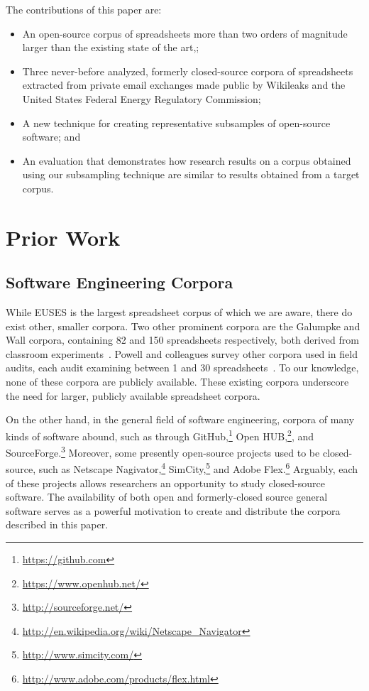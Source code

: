 \documentclass[conference]{IEEEtran}
\begin{document}
The contributions of this paper are:

\begin{itemize}
  \item An open-source corpus of spreadsheets more than two orders of magnitude larger
 		than the existing state of the art,;
  \item Three never-before analyzed, formerly closed-source corpora of spreadsheets extracted
  		from private email exchanges made public by Wikileaks and the United States Federal 
  		Energy Regulatory Commission;
  \item A new technique for creating representative subsamples of open-source
  		software; and
  \item An evaluation that demonstrates 
		how research results on a corpus obtained using our subsampling technique
		are similar to results obtained from a target corpus.
\end{itemize}

\section{Prior Work}


\subsection{Software Engineering Corpora}

While EUSES is the largest spreadsheet corpus of which we are aware, 
there do exist other, smaller corpora.
Two other prominent corpora are the Galumpke and Wall corpora, 
containing 82 and 150 spreadsheets respectively, both derived from
classroom experiments~\cite{panko2000two}.
Powell and colleagues survey other corpora used in field audits,
each audit examining between 1 and 30 spreadsheets~\cite{powell2008critical}.
To our knowledge, none of these corpora are publicly available.
These existing corpora underscore the need for larger,
publicly available spreadsheet corpora.

On the other hand, in the general field of software engineering,
corpora of many kinds of software abound,
such as through GitHub,\footnote{\url{https://github.com}}
Open HUB,\footnote{\url{https://www.openhub.net/}}, and 
SourceForge.\footnote{\url{http://sourceforge.net/}}
Moreover, some presently open-source projects used to be closed-source,
such as Netscape Nagivator,\footnote{\url{http://en.wikipedia.org/wiki/Netscape_Navigator}}
SimCity,\footnote{\url{http://www.simcity.com/}} and 
Adobe Flex.\footnote{\url{http://www.adobe.com/products/flex.html}}
Arguably, each of these projects allows researchers an opportunity to study
closed-source software.
The availability of both open and formerly-closed source general software
serves as a powerful motivation to create and distribute the corpora described
in this paper.
\end{document}
